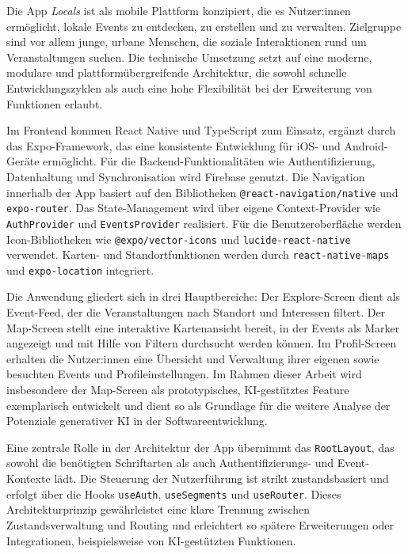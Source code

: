 \label{sec:vorstellung-app}

Die App \textit{Locals} ist als mobile Plattform konzipiert, die es
Nutzer:innen ermöglicht, lokale Events zu entdecken, zu erstellen und zu
verwalten. Zielgruppe sind vor allem junge, urbane Menschen, die soziale
Interaktionen rund um Veranstaltungen suchen. Die technische Umsetzung setzt
auf eine moderne, modulare und plattformübergreifende Architektur, die sowohl
schnelle Entwicklungszyklen als auch eine hohe Flexibilität bei der Erweiterung
von Funktionen erlaubt.

Im Frontend kommen React Native und TypeScript zum Einsatz, ergänzt durch das
Expo-Framework, das eine konsistente Entwicklung für iOS- und Android-Geräte
ermöglicht. Für die Backend-Funktionalitäten wie Authentifizierung,
Datenhaltung und Synchronisation wird Firebase genutzt. Die Navigation
innerhalb der App basiert auf den Bibliotheken
\texttt{@react-navigation/native} und \texttt{expo-router}. Das
State-Management wird über eigene Context-Provider wie \texttt{AuthProvider}
und \texttt{EventsProvider} realisiert. Für die Benutzeroberfläche werden
Icon-Bibliotheken wie \texttt{@expo/vector-icons} und
\texttt{lucide-react-native} verwendet. Karten- und Standortfunktionen werden
durch \texttt{react-native-maps} und \texttt{expo-location} integriert.

Die Anwendung gliedert sich in drei Hauptbereiche: Der Explore-Screen dient als
Event-Feed, der die Veranstaltungen nach Standort und Interessen filtert. Der
Map-Screen stellt eine interaktive Kartenansicht bereit, in der Events als
Marker angezeigt und mit Hilfe von Filtern durchsucht werden können. Im
Profil-Screen erhalten die Nutzer:innen eine Übersicht und Verwaltung ihrer
eigenen sowie besuchten Events und Profileinstellungen. Im Rahmen dieser Arbeit
wird insbesondere der Map-Screen als prototypisches, KI-gestütztes Feature
exemplarisch entwickelt und dient so als Grundlage für die weitere Analyse der
Potenziale generativer KI in der Softwareentwicklung.

Eine zentrale Rolle in der Architektur der App übernimmt das
\texttt{RootLayout}, das sowohl die benötigten Schriftarten als auch
Authentifizierungs- und Event-Kontexte lädt. Die Steuerung der Nutzerführung
ist strikt zustandsbasiert und erfolgt über die Hooks \texttt{useAuth},
\texttt{useSegments} und \texttt{useRouter}. Dieses Architekturprinzip
gewährleistet eine klare Trennung zwischen Zustandsverwaltung und Routing und
erleichtert so spätere Erweiterungen oder Integrationen, beispielsweise von
KI-gestützten Funktionen.

